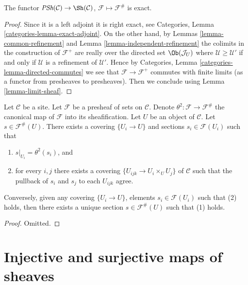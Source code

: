 \begin{lemma}
\label{lemma-sheafification-exact}
The functor $\textit{PSh}(\mathcal{C}) \to \Sh(\mathcal{C})$,
$\mathcal{F} \mapsto \mathcal{F}^\#$ is exact.
\end{lemma}

\begin{proof}
Since it is a left adjoint it is right exact, see
Categories, Lemma \ref{categories-lemma-exact-adjoint}.
On the other hand, by Lemmas \ref{lemma-common-refinement}
and Lemma \ref{lemma-independent-refinement} the colimits
in the construction of $\mathcal{F}^+$ are really over the
directed set $\Ob(\mathcal{J}_U)$ where
$\mathcal{U} \geq \mathcal{U}'$ if and only if
$\mathcal{U}$ is a refinement of $\mathcal{U}'$. Hence by
Categories, Lemma \ref{categories-lemma-directed-commutes}
we see that $\mathcal{F} \to \mathcal{F}^+$ commutes
with finite limits (as a functor from presheaves to
presheaves). Then we conclude using
Lemma \ref{lemma-limit-sheaf}.
\end{proof}

\begin{lemma}
\label{lemma-sections-sheafification}
Let $\mathcal{C}$ be a site.
Let $\mathcal{F}$ be a presheaf of sets on $\mathcal{C}$.
Denote $\theta^2 : \mathcal{F} \to \mathcal{F}^\#$ the canonical
map of $\mathcal{F}$ into its sheafification.
Let $U$ be an object of $\mathcal{C}$.
Let $s \in \mathcal{F}^\#(U)$. There exists
a covering $\{U_i \to U\}$ and sections
$s_i \in \mathcal{F}(U_i)$ such that
\begin{enumerate}
\item $s|_{U_i} = \theta^2(s_i)$, and
\item for every $i, j$ there exists a covering
$\{U_{ijk} \to U_i \times_U U_j\}$ of $\mathcal{C}$ such that
the pullback of $s_i$ and $s_j$ to each $U_{ijk}$ agree.
\end{enumerate}
Conversely, given any covering $\{U_i \to U\}$, elements
$s_i \in \mathcal{F}(U_i)$ such that (2) holds, then there
exists a unique section $s \in \mathcal{F}^\#(U)$ such
that (1) holds.
\end{lemma}

\begin{proof}
Omitted.
\end{proof}












\section{Injective and surjective maps of sheaves}
\label{section-sheaves-injective}

